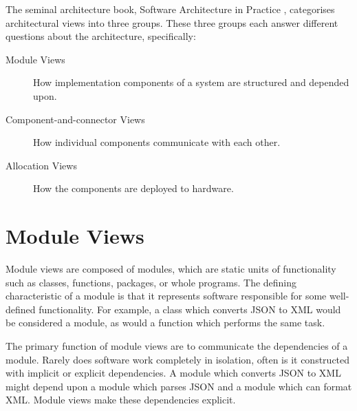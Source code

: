 The seminal architecture book, Software Architecture in Practice \cite{bass2021software},
categorises architectural views into three groups.
These three groups each answer different questions about the architecture, specifically:
\begin{description}
    \item[Module Views] How implementation components of a system are structured and depended upon.
    \item[Component-and-connector Views] How individual components communicate with each other.
    \item[Allocation Views] How the components are deployed to hardware.
\end{description}

\section{Module Views}
Module views are composed of modules, which are static units of functionality such as classes, functions, packages, or whole programs.
The defining characteristic of a module is that it represents software responsible for some well-defined functionality.
For example, a class which converts JSON to XML would be considered a module, as would a function which performs the same task.

The primary function of module views are to communicate the dependencies of a module.
Rarely does software work completely in isolation, often is it constructed with implicit or explicit dependencies.
A module which converts JSON to XML might depend upon a module which parses JSON and a module which can format XML.
Module views make these dependencies explicit.

